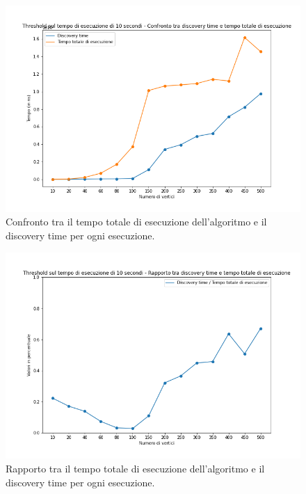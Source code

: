 \begin{figure}[H]
	\centering
	\includegraphics[width=1\textwidth]{res/images/single/karger-stein/discovery-time/threshold10/karger_stein_confronto_discovery_time_total_time_threshold_10s.png}
	\caption{Confronto tra il tempo totale di esecuzione dell'algoritmo e il discovery time per ogni esecuzione.}
	\label{fig:karger_stein_confronto_discovery_time_total_time_threshold_10s}
\end{figure}

\begin{figure}[H]
	\centering
	\includegraphics[width=1\textwidth]{res/images/single/karger-stein/discovery-time/threshold10/karger_stein_rapporto_discovery_time_total_time_threshold_10s.png}
	\caption{Rapporto tra il tempo totale di esecuzione dell'algoritmo 
	e il discovery time per ogni esecuzione.}
	\label{fig:karger_stein_rapporto_discovery_time_total_time_threshold_10s}
\end{figure}

